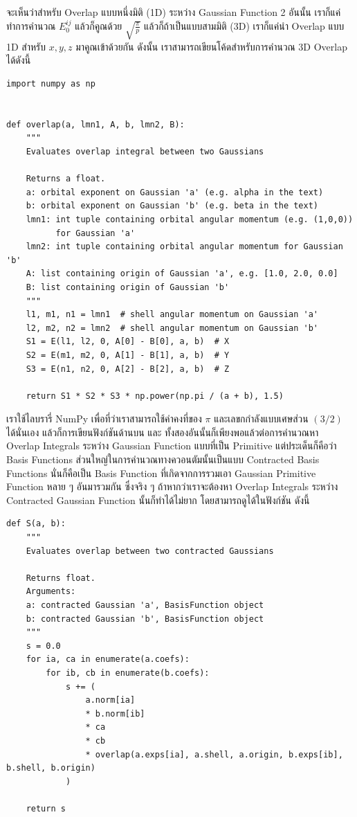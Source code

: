 \vspace{5pt}

จะเห็นว่าสำหรับ Overlap แบบหนึ่งมิติ (1D) ระหว่าง Gaussian Function 2 อันนั้น เราก็แค่ทำการคำนวณ $E_0^{ij}$ แล้วก็คูณด้วย $\sqrt{\frac{\pi}{p}}$ แล้วก็ถ้าเป็นแบบสามมิติ (3D) เราก็แค่นำ Overlap แบบ 1D สำหรับ $x,y,z$ มาคูณเข้าด้วยกัน ดังนั้น เราสามารถเขียนโค้ดสำหรับการคำนวณ 3D Overlap ได้ดังนี้

\vspace{5pt}

\begin{lstlisting}[style=MyPython]
import numpy as np


def overlap(a, lmn1, A, b, lmn2, B):
    """
    Evaluates overlap integral between two Gaussians

    Returns a float.
    a: orbital exponent on Gaussian 'a' (e.g. alpha in the text)
    b: orbital exponent on Gaussian 'b' (e.g. beta in the text)
    lmn1: int tuple containing orbital angular momentum (e.g. (1,0,0))
          for Gaussian 'a'
    lmn2: int tuple containing orbital angular momentum for Gaussian 'b'
    A: list containing origin of Gaussian 'a', e.g. [1.0, 2.0, 0.0]
    B: list containing origin of Gaussian 'b'
    """
    l1, m1, n1 = lmn1  # shell angular momentum on Gaussian 'a'
    l2, m2, n2 = lmn2  # shell angular momentum on Gaussian 'b'
    S1 = E(l1, l2, 0, A[0] - B[0], a, b)  # X
    S2 = E(m1, m2, 0, A[1] - B[1], a, b)  # Y
    S3 = E(n1, n2, 0, A[2] - B[2], a, b)  # Z

    return S1 * S2 * S3 * np.power(np.pi / (a + b), 1.5)
\end{lstlisting}

\vspace{5pt}

เราใช้ไลบรารี่ NumPy เพื่อที่ว่าเราสามารถใช้ค่าคงที่ของ $\pi$ และเลขกกำลังแบบเศษส่วน $(3/2)$ ได้นั่นเอง แล้วก็การเขียนฟังก์ชันด้านบน  และ  ทั้งสองอันนั้นก็เพียงพอแล้วต่อการคำนวณหา Overlap Integrals ระหว่าง Gaussian Function แบบที่เป็น Primitive แต่ประเด็นก็คือว่า Basis Functions ส่วนใหญ่ในการคำนวณทางควอนตัมนั้นเป็นแบบ Contracted Basis Functions นั่นก็คือเป็น Basis Function ที่เกิดจากการรวมเอา Gaussian Primitive Function หลาย ๆ อันมารวมกัน ซึ่งจริง ๆ ถ้าหากว่าเราจะต้องหา Overlap Integrals ระหว่าง Contracted Gaussian Function นั้นก็ทำได้ไม่ยาก โดยสามารถดูได้ในฟังก์ชัน  ดังนี้

\vspace{5pt}

\begin{lstlisting}[style=MyPython]
def S(a, b):
    """
    Evaluates overlap between two contracted Gaussians

    Returns float.
    Arguments:
    a: contracted Gaussian 'a', BasisFunction object
    b: contracted Gaussian 'b', BasisFunction object
    """
    s = 0.0
    for ia, ca in enumerate(a.coefs):
        for ib, cb in enumerate(b.coefs):
            s += (
                a.norm[ia]
                * b.norm[ib]
                * ca
                * cb
                * overlap(a.exps[ia], a.shell, a.origin, b.exps[ib], b.shell, b.origin)
            )

    return s
\end{lstlisting}

